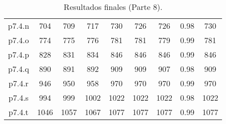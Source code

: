 \begin{table}
\begin{center}
\begin{tabular}{ |c|c|c|c|c|c|c|c|c| }
p7.4.n & 704 & 709 & 717 & 730 & 726 & 726 & 0.98 & 730  \\
p7.4.o & 774 & 775 & 776 & 781 & 781 & 779 & 0.99 & 781  \\
p7.4.p & 828 & 831 & 834 & 846 & 846 & 846 & 0.99 & 846  \\
p7.4.q & 890 & 891 & 892 & 909 & 909 & 907 & 0.98 & 909  \\
p7.4.r & 946 & 950 & 958 & 970 & 970 & 970 & 0.99 & 970  \\
p7.4.s & 994 & 999 & 1002 & 1022 & 1022 & 1022 & 0.98 & 1022  \\
p7.4.t & 1046 & 1057 & 1067 & 1077 & 1077 & 1077 & 0.99 & 1077  \\
\hline
\end{tabular}
\end{center}
\caption{Resultados finales (Parte 8).}
\label{tab:resultadosFinales8}
\end{table}

\bigskip




